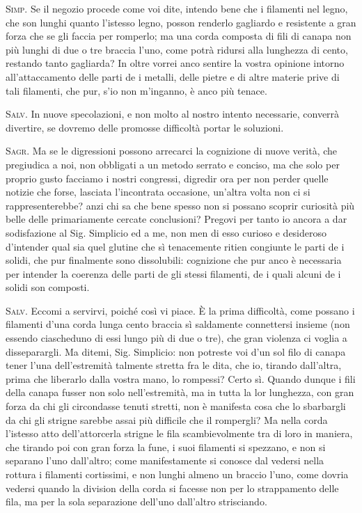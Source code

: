 \documentclass[11pt,twoside,openany]{book}
\newcommand{\speaker}[1]{\textcolor{rubric}{\textsc{#1}}\space}
\begin{document}
\speaker{Simp.} Se il negozio procede come voi dite, intendo bene che i filamenti nel legno, che son lunghi quanto l'istesso legno, posson renderlo gagliardo e resistente a gran forza che se gli faccia per romperlo; ma una corda composta di fili di canapa non più lunghi di due o tre braccia l'uno, come potrà ridursi alla lunghezza di cento, restando tanto gagliarda? In oltre vorrei anco sentire la vostra opinione intorno all'attaccamento delle parti de i metalli, delle pietre e di altre materie prive di tali filamenti, che pur, s'io non m'inganno, è anco più tenace.

\speaker{Salv.} In nuove specolazioni, e non molto al nostro intento necessarie, converrà divertire, se dovremo delle promosse difficoltà portar le soluzioni.

\speaker{Sagr.} Ma se le digressioni possono arrecarci la cognizione di nuove verità, che pregiudica a noi, non obbligati a un metodo serrato e conciso, ma che solo per proprio gusto facciamo i nostri congressi, digredir ora per non perder quelle notizie che forse, lasciata l'incontrata occasione, un'altra volta non ci si rappresenterebbe? anzi chi sa che bene spesso non si possano scoprir curiosità più belle delle primariamente cercate conclusioni? Pregovi per tanto io ancora a dar sodisfazione al Sig. Simplicio ed a me, non men di esso curioso e desideroso d'intender qual sia quel glutine che sì tenacemente ritien congiunte le parti de i solidi, che pur finalmente sono dissolubili: cognizione che pur anco è necessaria per intender la coerenza delle parti de gli stessi filamenti, de i quali alcuni de i solidi son composti.

\speaker{Salv.} Eccomi a servirvi, poiché così vi piace. È la prima difficoltà, come possano i filamenti d'una corda lunga cento braccia sì saldamente connettersi insieme (non essendo ciascheduno di essi lungo più di due o tre), che gran violenza ci voglia a disseparargli. Ma ditemi, Sig. Simplicio: non potreste voi d'un sol filo di canapa tener l'una dell'estremità talmente stretta fra le dita, che io, tirando dall'altra, prima che liberarlo dalla vostra mano, lo rompessi? Certo sì. Quando dunque i fili della canapa fusser non solo nell'estremità, ma in tutta la lor lunghezza, con gran forza da chi gli circondasse tenuti stretti, non è manifesta cosa che lo sbarbargli da chi gli strigne sarebbe assai più difficile che il rompergli? Ma nella corda l'istesso atto dell'attorcerla strigne le fila scambievolmente tra di loro in maniera, che tirando poi con gran forza la fune, i suoi filamenti si spezzano, e non si separano l'uno dall'altro; come manifestamente si conosce dal vedersi nella rottura i filamenti cortissimi, e non lunghi almeno un braccio l'uno, come dovria vedersi quando la division della corda si facesse non per lo strappamento delle fila, ma per la sola separazione dell'uno dall'altro strisciando.
\end{document}
